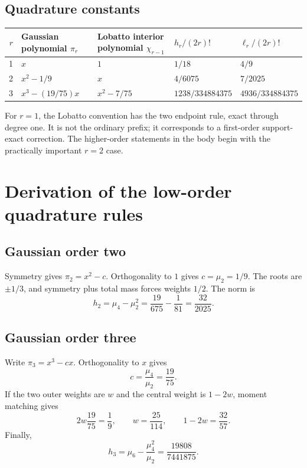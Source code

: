 \documentclass[11pt]{article}
\numberwithin{equation}{section}
\theoremstyle{definition}
\theoremstyle{remark}
\begin{document}
\subsection{Quadrature constants}

\begin{center}
\begin{tabularx}{0.98\textwidth}{@{}rXXll@{}}
\toprule
$r$ & Gaussian polynomial $\pi_r$ & Lobatto interior polynomial $\chi_{r-1}$ & $h_r/(2r)!$ & $\ell_r/(2r)!$\\
\midrule
1 & $x$ & $1$ & $1/18$ & $4/9$\\
2 & $x^2-1/9$ & $x$ & $4/6075$ & $7/2025$\\
3 & $x^3-(19/75)x$ & $x^2-7/75$ & $1238/334884375$ & $4936/334884375$\\
\bottomrule
\end{tabularx}
\end{center}

For $r=1$, the Lobatto convention has the two endpoint rule, exact through degree one.  It is not the ordinary prefix; it corresponds to a first-order support-exact correction.  The higher-order statements in the body begin with the practically important $r=2$ case.

\section{Derivation of the low-order quadrature rules}
\label{app:low-rules}

\subsection{Gaussian order two}

Symmetry gives $\pi_2=x^2-c$.  Orthogonality to $1$ gives $c=\mu_2=1/9$.  The roots are $\pm1/3$, and symmetry plus total mass forces weights $1/2$.  The norm is
\[
 h_2=\mu_4-\mu_2^2
 =\frac{19}{675}-\frac1{81}
 =\frac{32}{2025}.
\]

\subsection{Gaussian order three}

Write $\pi_3=x^3-cx$.  Orthogonality to $x$ gives
\[
 c=\frac{\mu_4}{\mu_2}=\frac{19}{75}.
\]
If the two outer weights are $w$ and the central weight is $1-2w$, moment matching gives
\[
 2w\frac{19}{75}=\frac19,
 \qquad
 w=\frac{25}{114},
 \qquad
 1-2w=\frac{32}{57}.
\]
Finally,
\[
 h_3=\mu_6-\frac{\mu_4^2}{\mu_2}
 =\frac{19808}{7441875}.
\]
\end{document}
